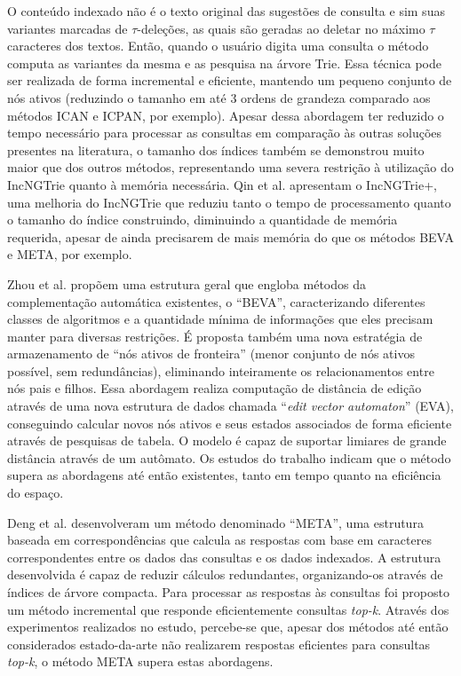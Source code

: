 O conteúdo indexado não é o texto original das sugestões de consulta e sim suas variantes marcadas de $\tau$-deleções, as quais são geradas ao deletar no máximo $\tau$ caracteres dos textos. Então, quando o usuário digita uma consulta o método computa as variantes da mesma e as pesquisa na árvore Trie. Essa técnica pode ser realizada de forma incremental e eficiente, mantendo um pequeno conjunto de nós ativos (reduzindo o tamanho em até 3 ordens de grandeza comparado aos métodos ICAN e ICPAN, por exemplo). 
Apesar dessa abordagem ter reduzido o tempo necessário para processar as consultas em comparação às outras soluções presentes na literatura, o tamanho dos índices também se demonstrou muito maior que dos outros métodos, representando uma severa restrição à utilização do IncNGTrie quanto à memória necessária. Qin et al. \citep{qin2020efficient} apresentam o IncNGTrie+, uma melhoria do IncNGTrie que reduziu tanto o tempo de processamento quanto o tamanho do índice construindo, diminuindo a quantidade de memória requerida, apesar de ainda precisarem de mais memória do que os métodos BEVA e META, por exemplo.

Zhou et al. \citep{zhou2016beva} propõem uma estrutura geral que engloba métodos da complementação automática existentes, o ``BEVA'', caracterizando diferentes classes de algoritmos e a quantidade mínima de informações que eles precisam manter para diversas restrições. É proposta também uma nova estratégia de armazenamento de ``nós ativos de fronteira'' (menor conjunto de nós ativos possível, sem redundâncias), eliminando inteiramente os relacionamentos entre nós pais e filhos. Essa abordagem realiza computação de distância de edição através de uma nova estrutura de dados chamada ``\textit{edit vector automaton}'' (EVA), conseguindo calcular novos nós ativos e seus estados associados de forma eficiente através de pesquisas de tabela. O modelo é capaz de suportar limiares de grande distância através de um autômato. Os estudos do trabalho indicam que o método supera as abordagens até então existentes, tanto em tempo quanto na eficiência do espaço.

Deng et al. \citep{deng2016meta} desenvolveram um método denominado ``META'', uma estrutura baseada em correspondências que calcula as respostas com base em caracteres correspondentes entre os dados das consultas e os dados indexados. A estrutura desenvolvida é capaz de reduzir cálculos redundantes, organizando-os através de índices de árvore compacta. Para processar as respostas às consultas foi proposto um método incremental que responde eficientemente consultas \textit{top-k}. Através dos experimentos realizados no estudo, percebe-se que, apesar dos métodos até então considerados estado-da-arte não realizarem respostas eficientes para consultas \textit{top-k}, o método META supera estas abordagens.

